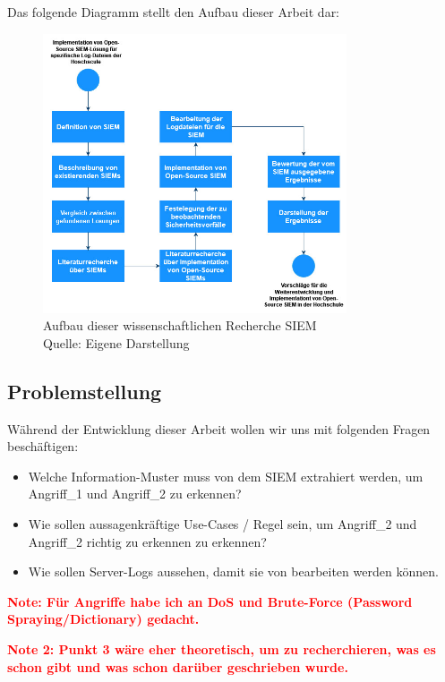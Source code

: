 Das folgende Diagramm stellt den Aufbau dieser Arbeit dar:

\begin{figure}[H]
   \centering
   \includegraphics[width=0.8\textwidth]{assets/1_p1.jpg}
   \caption{Aufbau dieser wissenschaftlichen Recherche \gls{SIEM} \\Quelle: Eigene Darstellung }
   \centering
\end{figure}

\subsection{Problemstellung}
Während der Entwicklung dieser Arbeit wollen wir uns mit folgenden Fragen beschäftigen:

\begin{itemize}
   \item Welche Information-Muster muss von dem \gls{SIEM} extrahiert werden, um Angriff\_1 und Angriff\_2 zu erkennen?
   \item Wie sollen aussagenkräftige Use-Cases / Regel sein, um Angriff\_2 und Angriff\_2 richtig zu erkennen zu erkennen?
   \item Wie sollen Server-Logs aussehen, damit sie von  bearbeiten werden können.
\end{itemize}

\textcolor{red}{\textbf{Note: Für Angriffe habe ich an DoS und Brute-Force (Password Spraying/Dictionary) gedacht.}}


\textcolor{red}{\textbf{Note 2: Punkt 3 wäre eher theoretisch, um zu recherchieren, was es schon gibt und was schon darüber geschrieben wurde.}}

